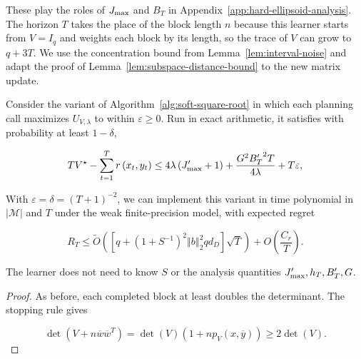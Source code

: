 {{{These play the roles of $J_{\text{\normalfont max}}$ and $B_{T}$ in Appendix~\ref{app:hard-ellipsoid-analysis}.
The horizon $T$ takes the place of the block length $n$ because this learner starts from
$V = I_{q}$ and weights each block by its length, so the trace of $V$ can grow to $q + 3 T$.}
We use the concentration bound from Lemma~\ref{lem:interval-noise} and adapt the
proof of Lemma~\ref{lem:subspace-distance-bound} to the new matrix update.


\begin{theorem}\label{thm:soft-square-root-regret}

  Consider the variant of Algorithm~\ref{alg:soft-square-root} in which
  each planning call maximizes $U_{V,\lambda}$ to within $\varepsilon\ge0$.
  Run in exact arithmetic, it satisfies with probability at least $1-\delta$,


\begin{equation*}
T V^{\star} - \sum_{t = 1}^{T} r \left( x_{t} , y_{t} \right) \le 4 \lambda \left( J_{\text{\normalfont max}}^{\prime} + 1 \right) + \frac{G^{2} {B_{T}^{\prime}}^{2} T}{4 \lambda} + T \varepsilon ,
\end{equation*}


  With $\varepsilon = \delta = {\left( T + 1 \right)}^{- 2}$, we can
  implement this variant in time polynomial in $\left| \mathcal{M} \right|$ and $T$
  under the weak finite-precision model, with expected regret


\begin{equation*}
R_{T} \le \tilde{O} \left( \left[ q + {\left( 1 + S^{- 1} \right)}^{2} {\left\Vert b \right\Vert}_{2}^{2} q d_{D} \right] \sqrt{T} \right) + O \left( \frac{C_{r}}{T} \right) .
\end{equation*}


  The learner does not need to know $S$ or the analysis quantities
  $J_{\text{\normalfont max}}^{\prime} , h_{T} , B_{T}^{\prime} , G$.

\end{theorem}


\begin{proof}
As before, each completed block at least doubles the
determinant. The stopping rule gives


\begin{equation*}
\operatorname{det} \left( V + n \overline{w} {\overline{w}}^{T} \right) = \operatorname{det} \left( V \right) \left( 1 + n p_{V} \left( x , \overline{y} \right) \right) \ge 2 \operatorname{det} \left( V \right) .
\end{equation*}



\end{proof}}}
